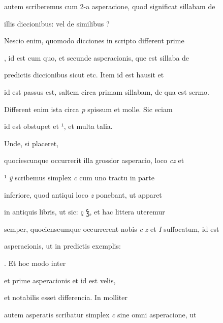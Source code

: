 autem scriberemus  cum 2-a asperacione, quod significat sillabam de

illis diccionibus:    vel de similibus ?

Nescio enim, quomodo dicciones in scripto different  prime 

, id est cum quo, et  secunde asperacionis, que est sillaba de

predictis diccionibus sicut  etc. Item  id est hausit et

 id est passus est, saltem circa primam sillabam, de qua est sermo.

Different enim ista circa \textit{p} spissum et molle. Sic eciam 

\splitlines

id est obstupet et ¹, et multa talia.

\indentK Unde, si placeret,

\fulllines

quociescunque occurrerit illa grossior asperacio,  loco \textit{cz} et

¹ \textit{ÿ} scribemus simplex \textit{c} cum uno tractu in parte

inferiore, quod antiqui loco \textit{z} ponebant, ut apparet

in antiquis libris, ut sic: ç {\Quivira ꝣ}, et hac littera uteremur

semper, quocienscumque occurrerent nobis \textit{c} \textit{z} et \textit{I} suffocatum, id est 

 asperacionis, ut in predictis exemplis:  

    . Et hoc modo inter 

et  prime asperacionis et  id est velis, 

 et  notabilis esset differencia. In molliter

autem asperatis scribatur simplex \textit{c} sine omni asperacione, ut

